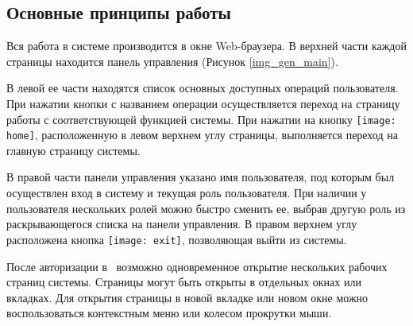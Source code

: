 \subsection{Основные принципы работы}

Вся работа в системе производится в окне Web-браузера. В верхней части каждой страницы находится панель управления (Рисунок \ref{img_gen_main}).

В левой ее части находятся список основных доступных операций пользователя. При нажатии кнопки с названием операции осуществляется переход на страницу работы с соответствующей функцией системы. При нажатии на кнопку \texttt{[image: home]}, расположенную в левом верхнем углу страницы, выполняется переход на главную страницу системы.

В правой части панели управления указано имя пользователя, под которым был осуществлен вход в систему и текущая роль пользователя. При наличии у пользователя нескольких ролей можно быстро сменить ее, выбрав другую роль из раскрывающегося списка на панели управления. В правом верхнем углу расположена кнопка \texttt{[image: exit]}, позволяющая выйти из системы.

\begin{prim}
 После авторизации в \tmis~возможно одновременное открытие нескольких рабочих страниц системы. Страницы могут быть открыты в отдельных окнах или вкладках. Для открытия страницы в новой вкладке или новом окне можно воспользоваться контекстным меню или колесом прокрутки мыши.
\end{prim}

